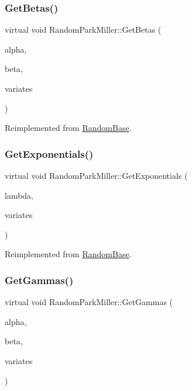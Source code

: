 \subsubsection{\texorpdfstring{Get\+Betas()}{GetBetas()}}
{\footnotesize\ttfamily virtual void Random\+Park\+Miller\+::\+Get\+Betas (\begin{DoxyParamCaption}\item[{double}]{alpha,  }\item[{double}]{beta,  }\item[{\hyperlink{classMJArray}{M\+J\+Array} \&}]{variates }\end{DoxyParamCaption})\hspace{0.3cm}{\ttfamily [virtual]}}



Reimplemented from \hyperlink{classRandomBase_aa3f3efa1333ab5d7689b8cc7ebd26622}{Random\+Base}.

\hypertarget{classRandomParkMiller_a33b21750d1694fec01ed7c10d49e8fba}{}\label{classRandomParkMiller_a33b21750d1694fec01ed7c10d49e8fba} 
\subsubsection{\texorpdfstring{Get\+Exponentials()}{GetExponentials()}}
{\footnotesize\ttfamily virtual void Random\+Park\+Miller\+::\+Get\+Exponentials (\begin{DoxyParamCaption}\item[{double}]{lambda,  }\item[{\hyperlink{classMJArray}{M\+J\+Array} \&}]{variates }\end{DoxyParamCaption})\hspace{0.3cm}{\ttfamily [virtual]}}



Reimplemented from \hyperlink{classRandomBase_ad1d2c39a8440f67cffda3ad41a4f9975}{Random\+Base}.

\hypertarget{classRandomParkMiller_a819811663cba7da72678c0a05aae62ce}{}\label{classRandomParkMiller_a819811663cba7da72678c0a05aae62ce} 
\subsubsection{\texorpdfstring{Get\+Gammas()}{GetGammas()}}
{\footnotesize\ttfamily virtual void Random\+Park\+Miller\+::\+Get\+Gammas (\begin{DoxyParamCaption}\item[{double}]{alpha,  }\item[{double}]{beta,  }\item[{\hyperlink{classMJArray}{M\+J\+Array} \&}]{variates }\end{DoxyParamCaption})\hspace{0.3cm}{\ttfamily [virtual]}}



